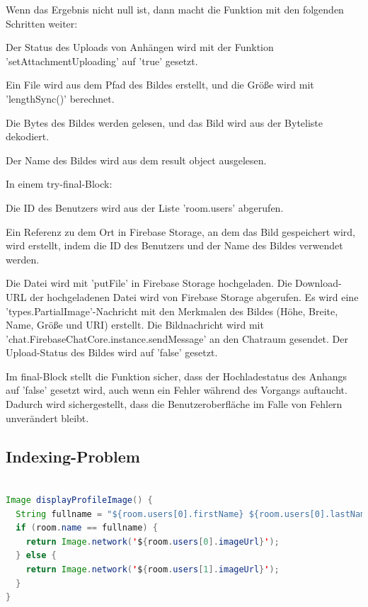 Wenn das Ergebnis nicht null ist, dann macht die Funktion mit den folgenden Schritten weiter:

Der Status des Uploads von Anhängen wird mit der Funktion 'setAttachmentUploading' auf 'true' gesetzt.

Ein File wird aus dem Pfad des Bildes erstellt, und die Größe wird mit 'lengthSync()' berechnet.

Die Bytes des Bildes werden gelesen, und das Bild wird aus der Byteliste dekodiert.

Der Name des Bildes wird aus dem result object ausgelesen.



In einem try-final-Block:

Die ID des Benutzers wird aus der Liste 'room.users' abgerufen.

Ein Referenz zu dem Ort in Firebase Storage, an dem das Bild gespeichert wird, wird erstellt, indem die ID des Benutzers und der Name des Bildes verwendet werden.

Die Datei wird mit 'putFile' in Firebase Storage hochgeladen.
Die Download-URL der hochgeladenen Datei wird von Firebase Storage abgerufen.
Es wird eine 'types.PartialImage'-Nachricht mit den Merkmalen des Bildes (Höhe, Breite, Name, Größe und URI) erstellt.
Die Bildnachricht wird mit 'chat.FirebaseChatCore.instance.sendMessage' an den Chatraum gesendet.
Der Upload-Status des Bildes wird auf 'false' gesetzt.

Im final-Block stellt die Funktion sicher, dass der Hochladestatus des Anhangs auf 'false' gesetzt wird, auch wenn ein Fehler während des Vorgangs auftaucht. Dadurch wird sichergestellt, dass die Benutzeroberfläche im Falle von Fehlern unverändert bleibt.

\subsection{Indexing-Problem}

\begin{lstlisting}[language=Java,caption=Anzeige des Profilbildes,label=lst:fotoSelektion]  

Image displayProfileImage() {
  String fullname = "${room.users[0].firstName} ${room.users[0].lastName}";
  if (room.name == fullname) {
    return Image.network('${room.users[0].imageUrl}');
  } else {
    return Image.network('${room.users[1].imageUrl}');
  }
}

\end{lstlisting}

